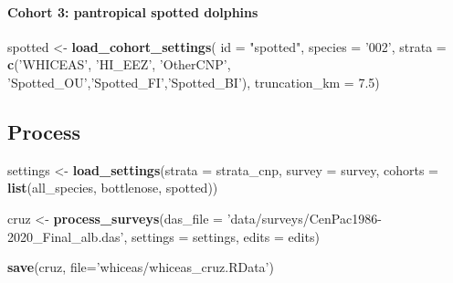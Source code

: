 \documentclass[
]{book}
\newenvironment{Shaded}{\begin{snugshade}}{\end{snugshade}}
\newcommand{\DataTypeTok}[1]{\textcolor[rgb]{0.13,0.29,0.53}{#1}}
\newcommand{\FloatTok}[1]{\textcolor[rgb]{0.00,0.00,0.81}{#1}}
\newcommand{\KeywordTok}[1]{\textcolor[rgb]{0.13,0.29,0.53}{\textbf{#1}}}
\newcommand{\NormalTok}[1]{#1}
\newcommand{\StringTok}[1]{\textcolor[rgb]{0.31,0.60,0.02}{#1}}
\begin{document}
\hypertarget{cohort-3-pantropical-spotted-dolphins}{%
\paragraph{Cohort 3: pantropical spotted dolphins}\label{cohort-3-pantropical-spotted-dolphins}}

\begin{Shaded}
\begin{Highlighting}[]
\NormalTok{spotted <-}\StringTok{ }\KeywordTok{load_cohort_settings}\NormalTok{(}
  \DataTypeTok{id =} \StringTok{"spotted"}\NormalTok{,}
  \DataTypeTok{species =} \StringTok{'002'}\NormalTok{,}
  \DataTypeTok{strata =} \KeywordTok{c}\NormalTok{(}\StringTok{'WHICEAS'}\NormalTok{, }\StringTok{'HI_EEZ'}\NormalTok{, }\StringTok{'OtherCNP'}\NormalTok{,}
             \StringTok{'Spotted_OU'}\NormalTok{,}\StringTok{'Spotted_FI'}\NormalTok{,}\StringTok{'Spotted_BI'}\NormalTok{),}
  \DataTypeTok{truncation_km =} \FloatTok{7.5}\NormalTok{)}
\end{Highlighting}
\end{Shaded}

\hypertarget{process}{%
\subsection*{Process}\label{process}}

\begin{Shaded}
\begin{Highlighting}[]
\NormalTok{settings <-}\StringTok{ }\KeywordTok{load_settings}\NormalTok{(}\DataTypeTok{strata =}\NormalTok{ strata_cnp,}
                          \DataTypeTok{survey =}\NormalTok{ survey,}
                          \DataTypeTok{cohorts =} \KeywordTok{list}\NormalTok{(all_species,}
\NormalTok{                                         bottlenose,}
\NormalTok{                                         spotted))}

\NormalTok{cruz <-}\StringTok{ }
\StringTok{  }\KeywordTok{process_surveys}\NormalTok{(}\DataTypeTok{das_file =} \StringTok{'data/surveys/CenPac1986-2020_Final_alb.das'}\NormalTok{,}
                  \DataTypeTok{settings =}\NormalTok{ settings,}
                  \DataTypeTok{edits =}\NormalTok{ edits) }

\KeywordTok{save}\NormalTok{(cruz, }\DataTypeTok{file=}\StringTok{'whiceas/whiceas_cruz.RData'}\NormalTok{)}
\end{Highlighting}
\end{Shaded}
\end{document}
